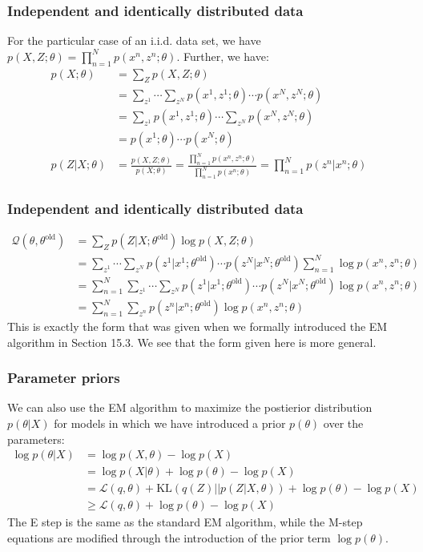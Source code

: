 \documentclass{beamer}
\begin{document}
\begin{frame}
    \frametitle{Independent and identically distributed data}
    For the particular case of an i.i.d. data set, we have $p(X,Z;\theta)=\prod_{n=1}^{N}p(x^{n},z^{n};\theta)$. Further, we have:
    \begin{align*}
        p(X;\theta)&=\sum_{Z}p(X,Z;\theta) \\
        &=\sum_{z^{1}}\cdots\sum_{z^{N}}p(x^{1},z^{1};\theta)\cdots{}p(x^{N},z^{N};\theta) \\
        &=\sum_{z^{1}}p(x^{1},z^{1};\theta)\cdots\sum_{z^{N}}p(x^{N},z^{N};\theta) \\
        &=p(x^{1};\theta)\cdots{}p(x^{N};\theta) \\
        p(Z|X;\theta)&=\frac{p(X,Z;\theta)}{p(X;\theta)}=\frac{\prod_{n=1}^{N}p(x^{n},z^{n};\theta)}{\prod_{n=1}^{N}p(x^{n};\theta)}=\prod_{n=1}^{N}p(z^{n}|x^{n};\theta)
    \end{align*}
\end{frame}

\begin{frame}
    \frametitle{Independent and identically distributed data}
    \begin{align*}
        \mathcal{Q}(\theta,\theta^{\textrm{old}})&=\sum_{Z}p(Z|X;\theta^{\textrm{old}})\log{}p(X,Z;\theta) \\
        &=\sum_{z^{1}}\cdots\sum_{z^{N}}p(z^{1}|x^{1};\theta^{\textrm{old}})\cdots{}p(z^{N}|x^{N};\theta^{\textrm{old}})\sum_{n=1}^{N}\log{}p(x^{n},z^{n};\theta) \\
        &=\sum_{n=1}^{N}\sum_{z^{1}}\cdots\sum_{z^{N}}p(z^{1}|x^{1};\theta^{\textrm{old}})\cdots{}p(z^{N}|x^{N};\theta^{\textrm{old}})\log{}p(x^{n},z^{n};\theta) \\
        &=\sum_{n=1}^{N}\sum_{z^{n}}p(z^{n}|x^{n};\theta^{\textrm{old}})\log{}p(x^{n},z^{n};\theta)
    \end{align*}
    This is exactly the form that was given when we formally introduced the EM algorithm in Section 15.3. We see that the form given here is more general. 
\end{frame}

\begin{frame}
    \frametitle{Parameter priors}
    We can also use the EM algorithm to maximize the postierior distribution $p(\theta|X)$ for models in which we have introduced a prior $p(\theta)$ over the parameters:
    \begin{align*}
        \log{}p(\theta|X)&=\log{}p(X,\theta)-\log{}p(X) \\
        &=\log{}p(X|\theta)+\log{}p(\theta)-\log{}p(X) \\
        &=\mathcal{L}(q,\theta)+\mathrm{KL}(q(Z)||p(Z|X,\theta))+\log{}p(\theta)-\log{}p(X) \\
        &\ge\mathcal{L}(q,\theta)+\log{}p(\theta)-\log{}p(X)
    \end{align*}
    The E step is the same as the standard EM algorithm, while the M-step equations are modified through the introduction of the prior term $\log{}p(\theta)$.
\end{frame}
\end{document}
